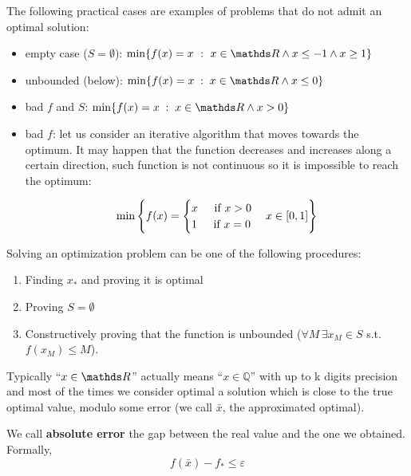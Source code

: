 \documentclass[computationalMathematics.tex]{subfiles}
\begin{document}
\begin{example}
	The following practical cases are examples of problems that do not admit an optimal solution:
	\begin{itemize}
		\item empty case ($S = \emptyset$): $\min \{ f(x) = x ~:~x \in \R \land x \leq -1 \land x \geq 1\}$
		\item unbounded (below):  $\min\{ f(x) = x \; : \; x \in \R \land x \leq 0\}$
		\item bad $f$ and  $S$:  $\min\{ f(x) = x \; : \; x \in \R \land x > 0\}$
		\item bad $f$: let us consider an iterative algorithm that moves towards the optimum.
		It may happen that the function decreases and increases along a certain direction, such function is not continuous so it is impossible to reach the optimum:
		
		\[
		\min \left\{f(x) =
		\begin{cases}
		x \hspace{0.4cm} \text{ if } x > 0 \\
		1 \hspace{0.4cm} \text{ if } x = 0
		\end{cases}
		x \in [0, 1]\right\}
		\]
	\end{itemize}	
\end{example}

\noindent Solving an optimization problem can be one of the following procedures: 
\begin{enumerate}
  \item Finding $x_*$ and proving it is optimal
  \item Proving $S = \emptyset$
  \item Constructively proving that the function is unbounded ($\forall M \, \exists x_M \in S$ s.t.~$f(x_M) \leq M$).
\end{enumerate}



Typically ``$x \in \R$'' actually means ``$x \in \mathbb{Q}$'' with up to k digits precision and most of the times we consider optimal a solution which is close to the true optimal value, modulo some error (we call $\bar{x}$, the approximated optimal).

\begin{definition}
  We call \textbf{absolute error} the gap between the real value and the one we obtained. Formally,
\[
  f(\bar{x}) - f_* \leq \varepsilon
\]
\end{definition}
\end{document}
